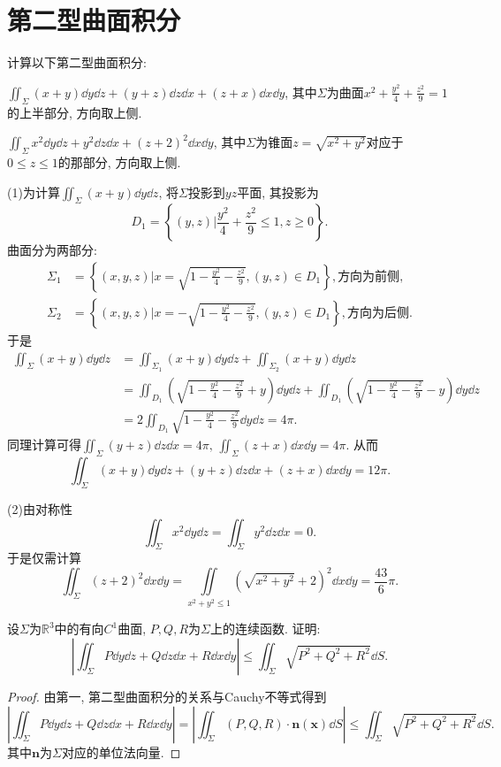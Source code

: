 \section{第二型曲面积分}
\begin{quiza}
\woe 计算以下第二型曲面积分:
\begin{quizs}
\item  \(\iint_{\varSigma}(x+y)\dd y\dd z+(y+z)\dd z\dd x+(z+x)\dd x\dd y\), 其中\(\varSigma\)为曲面\(x^2+\frac{y^2}{4}+\frac{z^2}{9}=1\)的上半部分, 方向取上侧.
\item \(\iint_{\varSigma}x^2\dd y\dd z+y^2\dd z\dd x+(z+2)^2\dd x\dd y\), 其中\(\varSigma\)为锥面\(z=\sqrt{x^2+y^2}\)对应于\(0\leqslant z\leqslant 1\)的那部分, 方向取上侧.
\end{quizs}
\begin{solution}
(1)为计算\(\iint_{\varSigma}(x+y)\dd y\dd z\), 将\(\varSigma\)投影到\(yz\)平面, 其投影为\[D_1=\left\lbrace(y,z)\big|\frac{y^2}{4}+\frac{z^2}{9}\leqslant 1,z\geqslant 0\right\rbrace.\]曲面分为两部分:\[\begin{split}
\varSigma_1&=\left\lbrace (x,y,z)\big|x=\sqrt{1-\frac{y^2}{4}-\frac{z^2}{9}},(y,z)\in D_1 \right\rbrace,\text{方向为前侧},\\
\varSigma_2&=\left\lbrace (x,y,z)\big|x=-\sqrt{1-\frac{y^2}{4}-\frac{z^2}{9}},(y,z)\in D_1 \right\rbrace,\text{方向为后侧}.
\end{split}\]于是\[\begin{split}
\iint_{\varSigma}(x+y)\dd y\dd z&=\iint_{\varSigma_1}(x+y)\dd y\dd z+\iint_{\varSigma_2}(x+y)\dd y\dd z\\
&=\iint_{D_1}\left(\sqrt{1-\frac{y^2}{4}-\frac{z^2}{9}}+y\right)\dd y\dd z+\iint_{D_1}\left(\sqrt{1-\frac{y^2}{4}-\frac{z^2}{9}}-y\right)\dd y\dd z\\&=2\iint_{D_1}\sqrt{1-\frac{y^2}{4}-\frac{z^2}{9}}\dd y\dd z=4\pi.
\end{split}\]
同理计算可得\(\iint_{\varSigma}(y+z)\dd z\dd x=4\pi,\,\iint_{\varSigma}(z+x)\dd x\dd y=4\pi\). 从而\[\iint_{\varSigma}(x+y)\dd y\dd z+(y+z)\dd z\dd x+(z+x)\dd x\dd y=12\pi.\]

(2)由对称性\[\iint_{\varSigma}x^2\dd y\dd z=\iint_{\varSigma}y^2\dd z\dd x=0.\]于是仅需计算\[\iint_{\varSigma}(z+2)^2\dd x\dd y=\iint\limits_{x^2+y^2\leqslant 1}\left(\sqrt{x^2+y^2}+2\right)^2\dd x\dd y=\frac{43}{6}\pi.\]
\end{solution}
\woe 设\(\varSigma\)为\(\mathbb{R}^3\)中的有向\(C^1\)曲面, \(P,Q,R\)为\(\varSigma\)上的连续函数. 证明:\[\left|\iint_{\varSigma}P\dd y\dd z+Q\dd z\dd x+R\dd x\dd y\right|\leqslant\iint_{\varSigma}\sqrt{P^2+Q^2+R^2}\dd S.\]
\begin{proof}
由第一, 第二型曲面积分的关系与Cauchy不等式得到\[\left|\iint_{\varSigma}P\dd y\dd z+Q\dd z\dd x+R\dd x\dd y\right|=\left|\iint_{\varSigma}\left(P,Q,R\right)\cdot\boldsymbol{n}(\boldsymbol{x})\dd S\right|\leqslant\iint_{\varSigma}\sqrt{P^2+Q^2+R^2}\dd S.\]其中\(\boldsymbol{n}\)为\(\varSigma\)对应的单位法向量.
\end{proof}
\end{quiza}
